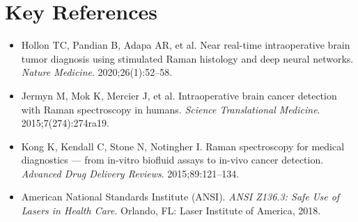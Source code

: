 \section{Key References}
\begin{itemize}
  \item Hollon TC, Pandian B, Adapa AR, et al. Near real-time intraoperative brain tumor diagnosis using stimulated Raman histology and deep neural networks. \emph{Nature Medicine}. 2020;26(1):52--58.
  \item Jermyn M, Mok K, Mercier J, et al. Intraoperative brain cancer detection with Raman spectroscopy in humans. \emph{Science Translational Medicine}. 2015;7(274):274ra19.
  \item Kong K, Kendall C, Stone N, Notingher I. Raman spectroscopy for medical diagnostics --- from in-vitro biofluid assays to in-vivo cancer detection. \emph{Advanced Drug Delivery Reviews}. 2015;89:121--134.
  \item American National Standards Institute (ANSI). \emph{ANSI Z136.3: Safe Use of Lasers in Health Care}. Orlando, FL: Laser Institute of America, 2018.
\end{itemize}
